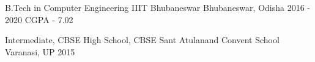 

\begin{cventries}

  \cventry
    {B.Tech in Computer Engineering} %
    {IIIT Bhubaneswar} %
    {Bhubaneswar, Odisha} %
    {2016 - 2020} %
    { CGPA - 7.02
    }
    
  \cventry
    {Intermediate, CBSE \linebreak High School, CBSE} %
    {Sant Atulanand Convent School } %
    {Varanasi, UP} %
    {2015 } %
    {
    }
\vspace{-0.7cm}
\end{cventries}
